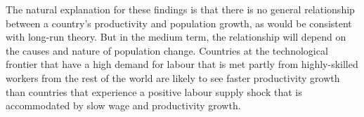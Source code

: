 \documentclass[
  12pt,
  letterpaper,
]{article}
\begin{document}
The natural explanation for these findings is that there is no general
relationship between a country's productivity and population growth, as
would be consistent with long-run theory. But in the medium term, the
relationship will depend on the causes and nature of population change.
Countries at the technological frontier that have a high demand for
labour that is met partly from highly-skilled workers from the rest of
the world are likely to see faster productivity growth than countries
that experience a positive labour supply shock that is accommodated by
slow wage and productivity growth.


\printbibliography[title=References]
\end{document}
